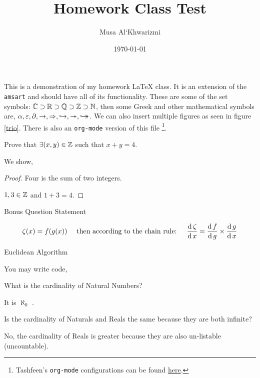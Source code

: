 \documentclass{../src/homework}
\author{Musa Al`Khwarizmi}
\date{\today}
\title{Homework Class Test}
\begin{document}
 \maketitle

This is a demonstration of my homework \LaTeX{} class. It is an extension of the \texttt{amsart} and should have all of its functionality. These are some of the set symbols: $\bC \supset \bR \supset \bQ \supset \bZ \supset \bN$, then some Greek and other mathematical symbols are, $\al, \ep, \p, \ra, \Ra, \injective, \surjective, \bijective$. We can also insert multiple figures as seen in figure \ref{trio}. There is also an \texttt{org-mode} version of this file \footnote{Tashfeen's \texttt{org-mode} configurations can be found \href{https://github.com/simurgh9/emacs786}{here}.}.


\begin{question} Prove that $\exists (x,y) \in \bZ$ such that $x+y = 4$.

  We show,
  \begin{proof} Four is the sum of two integers.
    
    $1,3 \in \bZ$ and $1+3=4$.
  \end{proof}
\end{question}


\begin{bonus} Bonus Question Statement 

  \lipsum[2]
  \[
    \zeta(x) = f(g(x)) \quad \text{ then according to the chain rule: } \quad
    \derivative{\zeta} = \derivative[g]{f} \times \derivative{g}
  \]
\end{bonus}

\begin{bonus} Euclidean Algorithm

  You may write code,
  
  
\end{bonus}

\begin{question} What is the cardinality of Natural Numbers?
    
  It is $\aleph_0$ \cite{arlinghaus1996part}.
\end{question}

\begin{question} Is the cardinality of Naturals and Reals the same because they are both infinite?

  No, the cardinality of Reals is greater because they are also un-listable (uncountable).
\end{question}
\end{document}
